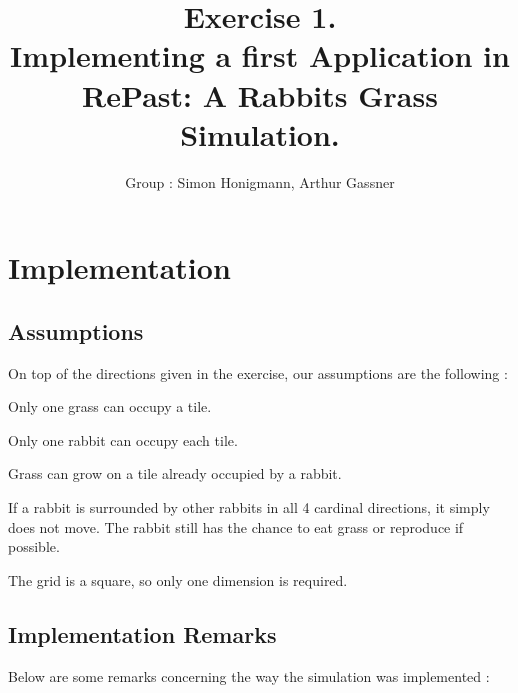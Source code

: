 \documentclass[11pt]{article}
\title{\bf Exercise 1.\\ Implementing a first Application in RePast: A Rabbits Grass Simulation.}
\author{Group \textnumero76: Simon Honigmann, Arthur Gassner}
\begin{document}
\maketitle

\section{Implementation}

\subsection{Assumptions}
On top of the directions given in the exercise, our assumptions are the following :\\

\begin{compactenum} 
	\item Only one grass can occupy a tile.
	\item Only one rabbit can occupy each tile.
	\item Grass can grow on a tile already occupied by a rabbit.
	\item If a rabbit is surrounded by other rabbits in all 4 cardinal directions, it simply does not move. The rabbit still has the chance to eat grass or reproduce if possible.
	\item The grid is a square, so only one dimension is required.
\end{compactenum}

\subsection{Implementation Remarks}
Below are some remarks concerning the way the simulation was implemented :\\
\end{document}
